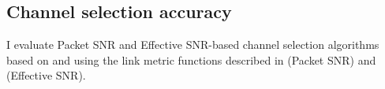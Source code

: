 %
%
%

\subsection{Channel selection accuracy}
I evaluate Packet SNR and Effective SNR-based channel selection algorithms based on  and using the link metric functions described in  (Packet SNR) and  (Effective SNR).

